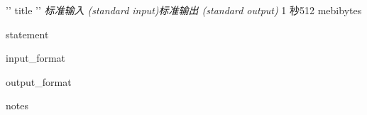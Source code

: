 \begin{problem}{{ '{' }}{{ title }}{{ '}' }}
{\textsl{标准输入 (standard input)}}{\textsl{标准输出 (standard output)}}
{1 秒}{512 mebibytes}{}

{{ statement }}

\InputFile

{{ input_format }}

\OutputFile

{{ output_format }}

\Examples

\begin{example}
\end{example}

{{ notes }}

\end{problem}
